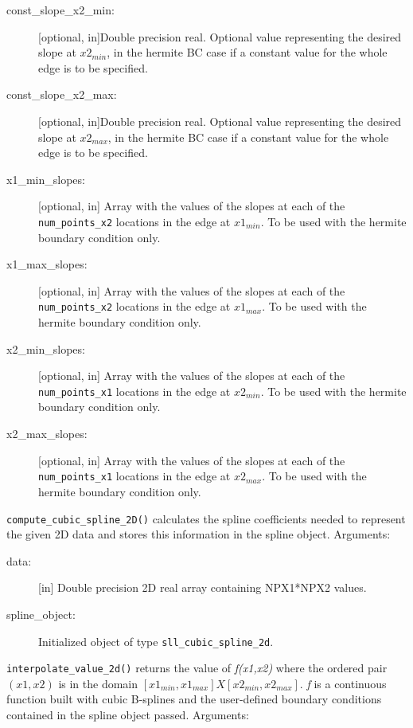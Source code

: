 \documentclass[]{report}   %
\begin{document}
\begin{description}
\begin{description}
		\item[const\_slope\_x2\_min:]
	[optional, in]Double precision real. Optional value representing the desired slope at $x2_{min}$, in the hermite BC case if a constant value for the whole edge is to be specified.
		\item[const\_slope\_x2\_max:]
		[optional, in]Double precision real. Optional value representing the desired slope at $x2_{max}$, in the hermite BC case if a constant value for the whole edge is to be specified.
		\item[x1\_min\_slopes:]
		[optional, in] Array with the values of the slopes at each of the \verb+num_points_x2+ locations in the edge at $x1_{min}$. To be used with the hermite boundary condition only.
		\item[x1\_max\_slopes:]
		[optional, in] Array with the values of the slopes at each of the \verb+num_points_x2+ locations in the edge at $x1_{max}$. To be used with the hermite boundary condition only.
		\item[x2\_min\_slopes:]
		[optional, in] Array with the values of the slopes at each of the \verb+num_points_x1+ locations in the edge at $x2_{min}$. To be used with the hermite boundary condition only.
		\item[x2\_max\_slopes:]
		[optional, in] Array with the values of the slopes at each of the \verb+num_points_x1+ locations in the edge at $x2_{max}$. To be used with the hermite boundary condition only.
	\end{description}

	\item \verb+compute_cubic_spline_2D()+ calculates the spline coefficients needed to represent the given 2D data and stores this information in the spline object. Arguments:
	
	\begin{description}
		\item[ data:] [in] Double precision 2D real array containing NPX1*NPX2 values.
		\item[ spline\_object: ] Initialized object of type \verb+sll_cubic_spline_2d+.
	\end{description}


	\item \verb+interpolate_value_2d()+ returns the value of \emph{f(x1,x2)} where the ordered pair $(x1,x2)$ is in the domain $[x1_{min},x1_{max}] X [x2_{min},x2_{max}]$. \emph{f} is a continuous function built with cubic B-splines and the user-defined boundary conditions contained in the spline object passed.  Arguments:
	

\end{description}
\end{document}

